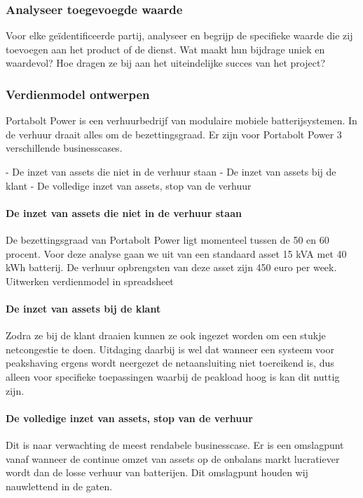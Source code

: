 \subsubsection{Analyseer toegevoegde waarde}
Voor elke geïdentificeerde partij, analyseer en begrijp de specifieke waarde die zij toevoegen aan het product of de dienst. Wat maakt hun bijdrage uniek en waardevol? Hoe dragen ze bij aan het uiteindelijke succes van het project?

\subsubsection{Verdienmodel ontwerpen}
Portabolt Power is een verhuurbedrijf van modulaire mobiele batterijsystemen. In de verhuur draait alles om de bezettingsgraad. Er zijn voor Portabolt Power 3 verschillende businesscases.

-	De inzet van assets die niet in de verhuur staan 
-	De inzet van assets bij de klant
-	De volledige inzet van assets, stop van de verhuur

\paragraph{De inzet van assets die niet in de verhuur staan }
De bezettingsgraad van Portabolt Power ligt momenteel tussen de 50 en 60 procent. Voor deze analyse gaan we uit van een standaard asset 15 kVA met 40 kWh batterij. De verhuur opbrengsten van deze asset zijn 450 euro per week. 
Uitwerken verdienmodel in spreadsheet


\paragraph{De inzet van assets bij de klant}
Zodra ze bij de klant draaien kunnen ze ook ingezet worden om een stukje netcongestie te doen. Uitdaging daarbij is wel dat wanneer een systeem voor peakshaving ergens wordt neergezet de netaansluiting niet toereikend is, dus alleen voor specifieke toepassingen waarbij de peakload hoog is kan dit nuttig zijn. 

\paragraph{De volledige inzet van assets, stop van de verhuur}
Dit is naar verwachting de meest rendabele businesscase. Er is een omslagpunt vanaf wanneer de continue omzet van assets op de onbalans markt lucratiever wordt dan de losse verhuur van batterijen. Dit omslagpunt houden wij nauwlettend in de gaten. 


